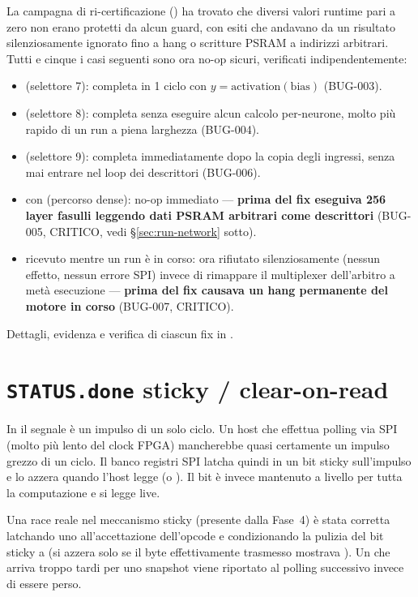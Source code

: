 \begin{fnwarn}[Casi limite ``reale=0'' corretti (2026-09-04)]
La campagna di ri-certificazione () ha trovato che diversi
valori runtime pari a zero non erano protetti da alcun guard, con esiti che andavano da un
risultato silenziosamente ignorato fino a hang o scritture PSRAM a indirizzi arbitrari.
Tutti e cinque i casi seguenti sono ora no-op sicuri, verificati indipendentemente:
\begin{itemize}
\item {} (selettore 7): completa in 1 ciclo con
$y=\text{activation}(\text{bias})$ (BUG-003).
\item {} (selettore 8): completa senza eseguire alcun calcolo
per-neurone, molto più rapido di un run a piena larghezza (BUG-004).
\item {} (selettore 9): completa immediatamente dopo la copia
degli ingressi, senza mai entrare nel loop dei descrittori (BUG-006).
\item {} con  (percorso dense): no-op immediato ---
\textbf{prima del fix eseguiva 256 layer fasulli leggendo dati PSRAM arbitrari come
descrittori} (BUG-005, CRITICO, vedi \S\ref{sec:run-network} sotto).
\item {} ricevuto mentre un run è in corso: ora rifiutato silenziosamente
(nessun effetto, nessun errore SPI) invece di rimappare il multiplexer dell'arbitro a metà
esecuzione --- \textbf{prima del fix causava un hang permanente del motore in corso}
(BUG-007, CRITICO).
\end{itemize}
Dettagli, evidenza e verifica di ciascun fix in .
\end{fnwarn}

\section{\texttt{STATUS.done} sticky / clear-on-read}
In  il segnale  è un impulso di un solo ciclo. Un host
che effettua polling via SPI (molto più lento del clock FPGA) mancherebbe quasi
certamente un impulso grezzo di un ciclo. Il banco registri SPI latcha quindi
 in un bit sticky sull'impulso e lo azzera quando l'host legge 
(o ). Il bit  è invece mantenuto a livello per tutta la
computazione e si legge live.

\begin{fnwarn}
Una race reale nel meccanismo sticky (presente dalla Fase~4) è stata corretta latchando
uno  all'accettazione dell'opcode  e condizionando la
pulizia del bit sticky a  (si azzera solo se il byte
effettivamente trasmesso mostrava ). Un  che arriva troppo tardi
per uno snapshot viene riportato al polling successivo invece di essere perso.
\end{fnwarn}


